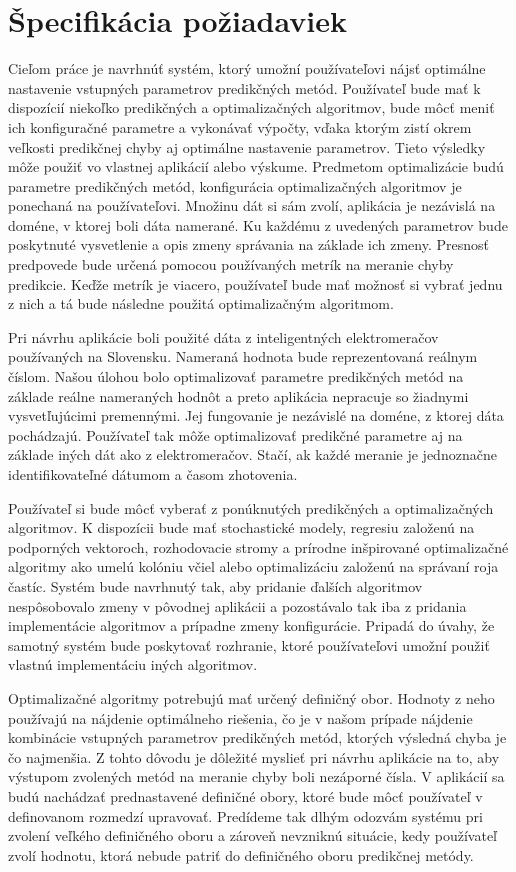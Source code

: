 \documentclass[a4paper,slovak,12pt,appendix]{article}
\begin{document}
\section{Špecifikácia požiadaviek}
\label{specification}
Cieľom práce je navrhnúť systém, ktorý umožní používateľovi nájsť optimálne
nastavenie vstupných parametrov predikčných metód. Používateľ bude mať
k dispozícií niekoľko predikčných a optimalizačných algoritmov, bude môcť
meniť ich konfiguračné parametre a vykonávať výpočty, vďaka ktorým zistí okrem
veľkosti predikčnej chyby aj optimálne nastavenie parametrov. Tieto výsledky
môže použiť vo vlastnej aplikácií alebo výskume. Predmetom optimalizácie budú
parametre predikčných metód, konfigurácia optimalizačných algoritmov je
ponechaná na používateľovi. Množinu dát si sám zvolí, aplikácia
je nezávislá na doméne, v ktorej boli dáta namerané. Ku každému z uvedených
parametrov bude poskytnuté vysvetlenie a opis zmeny správania na základe
ich zmeny. Presnosť predpovede bude určená pomocou používaných metrík na
meranie chyby predikcie. Keďže metrík je viacero, používateľ bude mať možnosť
si vybrať jednu z nich a tá bude následne použitá optimalizačným algoritmom.

Pri návrhu aplikácie boli použité dáta z inteligentných elektromeračov
používaných na Slovensku. Nameraná hodnota bude reprezentovaná reálnym číslom.
Našou úlohou bolo optimalizovať parametre predikčných metód na základe reálne
nameraných hodnôt a preto aplikácia nepracuje so žiadnymi vysvetľujúcimi
premennými. Jej fungovanie je nezávislé na doméne, z ktorej dáta pochádzajú.
Používateľ tak môže optimalizovať predikčné parametre aj na základe iných dát
ako z elektromeračov. Stačí, ak každé meranie je jednoznačne identifikovateľné
dátumom a časom zhotovenia.

Používateľ si bude môcť vyberať z ponúknutých predikčných a optimalizačných
algoritmov. K dispozícii bude mať stochastické modely,
regresiu založenú na podporných vektoroch, rozhodovacie stromy a prírodne
inšpirované optimalizačné algoritmy ako umelú kolóniu včiel alebo optimalizáciu
založenú na správaní roja častíc. Systém bude navrhnutý tak, aby pridanie
ďalších algoritmov nespôsobovalo zmeny v pôvodnej aplikácii a pozostávalo tak
iba z pridania implementácie algoritmov a prípadne zmeny konfigurácie.
Pripadá do úvahy, že samotný systém bude poskytovať rozhranie, ktoré
používateľovi umožní použiť vlastnú implementáciu iných algoritmov.

Optimalizačné algoritmy potrebujú mať určený definičný obor. Hodnoty
z neho používajú na nájdenie optimálneho riešenia, čo je v našom prípade
nájdenie kombinácie vstupných parametrov predikčných metód, ktorých výsledná
chyba je čo najmenšia. Z tohto dôvodu je dôležité myslieť pri návrhu aplikácie
na to, aby výstupom zvolených metód na meranie chyby boli nezáporné čísla.
V aplikácií sa budú nachádzať prednastavené definičné obory, ktoré bude môcť
používateľ v definovanom rozmedzí upravovať. Predídeme tak dlhým odozvám
systému pri zvolení veľkého definičného oboru a zároveň nevzniknú situácie,
kedy používateľ zvolí hodnotu, ktorá nebude patriť do definičného oboru
predikčnej metódy.
\end{document}
